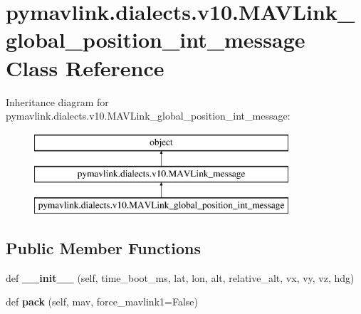 \hypertarget{classpymavlink_1_1dialects_1_1v10_1_1MAVLink__global__position__int__message}{}\section{pymavlink.\+dialects.\+v10.\+M\+A\+V\+Link\+\_\+global\+\_\+position\+\_\+int\+\_\+message Class Reference}
\label{classpymavlink_1_1dialects_1_1v10_1_1MAVLink__global__position__int__message}
Inheritance diagram for pymavlink.\+dialects.\+v10.\+M\+A\+V\+Link\+\_\+global\+\_\+position\+\_\+int\+\_\+message\+:\begin{figure}[H]
\begin{center}
\leavevmode
\includegraphics[height=3.000000cm]{classpymavlink_1_1dialects_1_1v10_1_1MAVLink__global__position__int__message}
\end{center}
\end{figure}
\subsection*{Public Member Functions}
\begin{DoxyCompactItemize}
\item 
\mbox{\label{classpymavlink_1_1dialects_1_1v10_1_1MAVLink__global__position__int__message_aac4ecbce7d368bf5180d71028d746678}} 
def {\bfseries \+\_\+\+\_\+init\+\_\+\+\_\+} (self, time\+\_\+boot\+\_\+ms, lat, lon, alt, relative\+\_\+alt, vx, vy, vz, hdg)
\item 
\mbox{\label{classpymavlink_1_1dialects_1_1v10_1_1MAVLink__global__position__int__message_a2408dee7738f0b997f55297c5b310a39}} 
def {\bfseries pack} (self, mav, force\+\_\+mavlink1=False)
\end{DoxyCompactItemize}
